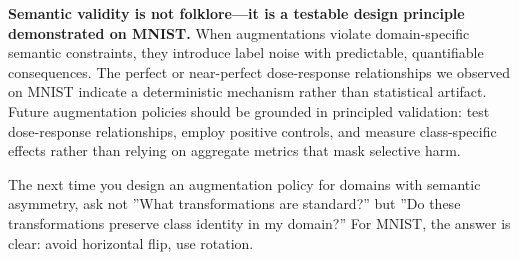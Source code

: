 \textbf{Semantic validity is not folklore---it is a testable design principle demonstrated on MNIST.} When augmentations violate domain-specific semantic constraints, they introduce label noise with predictable, quantifiable consequences. The perfect or near-perfect dose-response relationships we observed on MNIST indicate a deterministic mechanism rather than statistical artifact. Future augmentation policies should be grounded in principled validation: test dose-response relationships, employ positive controls, and measure class-specific effects rather than relying on aggregate metrics that mask selective harm.

The next time you design an augmentation policy for domains with semantic asymmetry, ask not ''What transformations are standard?'' but ''Do these transformations preserve class identity in my domain?'' For MNIST, the answer is clear: avoid horizontal flip, use rotation.

